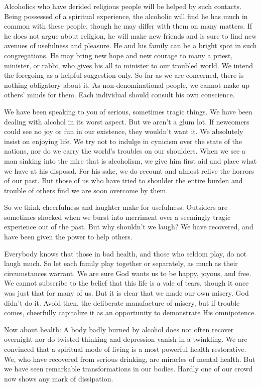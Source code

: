 \begin{biblechapter}
Alcoholics who have derided religious people will be helped by such contacts.  Being possessed of a spiritual experience, the alcoholic will find he has much in common with these people, though he may differ with them on many matters.  If he does not argue about religion, he will make new friends and is sure to find new avenues of usefulness and pleasure.  He and his family can be a bright spot in such congregations.  He may bring new hope and new courage to many a priest, minister, or rabbi, who gives his all to minister to our troubled world.  We intend the foregoing as a helpful suggestion only.  So far as we are concerned, there is nothing obligatory about it.  As non-denominational people, we cannot make up others' minds for them.  Each individual should consult his own conscience.

We have been speaking to you of serious, sometimes tragic things.  We have been dealing with alcohol in its worst aspect.  But we aren't a glum lot.  If newcomers could see no joy or fun in our existence, they wouldn't want it.  We absolutely insist on enjoying life.  We try not to indulge in cynicism over the state of the nations, nor do we carry the world's troubles on our shoulders.  When we see a man sinking into the mire that is alcoholism, we give him first aid and place what we have at his disposal.  For his sake, we do recount and almost relive the horrors of our past.  But those of us who have tried to shoulder the entire burden and trouble of others find we are soon overcome by them.

So we think cheerfulness and laughter make for usefulness.  Outsiders are sometimes shocked when we burst into merriment over a seemingly tragic experience out of the past.  But why shouldn't we laugh?  We have recovered, and have been given the power to help others.

Everybody knows that those in bad health, and those who seldom play, do not laugh much.  So let each family play together or separately, as much as their circumstances warrant.  We are sure God wants us to be happy, joyous, and free.  We cannot subscribe to the belief that this life is a vale of tears, though it once was just that for many of us.  But it is clear that we made our own misery.  God didn't do it.  Avoid then, the deliberate manufacture of misery, but if trouble comes, cheerfully capitalize it as an opportunity to demonstrate His omnipotence.

Now about health:  A body badly burned by alcohol does not often recover overnight nor do twisted thinking and depression vanish in a twinkling.  We are convinced that a spiritual mode of living is a most powerful health restorative.  We, who have recovered from serious drinking, are miracles of mental health.  But we have seen remarkable transformations in our bodies.  Hardly one of our crowd now shows any mark of dissipation.


\end{biblechapter}
